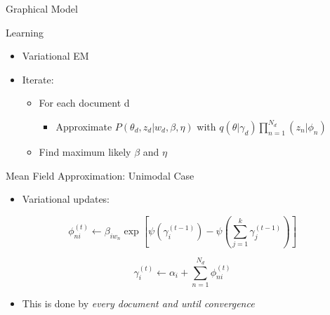 \documentclass[pdf]{beamer}
\begin{document}
\begin{frame}{Graphical Model}
\end{frame}

\begin{frame}{Learning}
	\begin{itemize}
		\item Variational EM
		\item Iterate:
		\begin{itemize}
			\item For each document d
				\begin{itemize}
					\item Approximate $P(\theta_d, z_d|w_d, \beta, \eta)$ with $q(\theta|\gamma_d) \prod_{n=1}^{N_d}(z_n|\phi_n)$
				\end{itemize}
			\item Find maximum likely $\beta$ and $\eta$
		\end{itemize}
	\end{itemize}
\end{frame}

\begin{frame}{Mean Field Approximation: Unimodal Case}
	\begin{itemize}
		\item Variational updates:
	\end{itemize}
	\begin{equation*}
		\phi_{ni}^{(t)} \gets \beta_{i w_n} \exp\left[\psi\left(\gamma_{i}^{(t-1)}\right) - \psi\left({\sum_{j=1}^k \gamma_j^{(t-1)}}\right)\right]
	\end{equation*}
	
	\begin{equation*}
		\gamma_i^{(t)}\gets \alpha_i + \sum_{n=1}^{N_d} \phi_{ni}^{(t)}
	\end{equation*}
	\begin{itemize}
		\item This is done by \textit{every document and until convergence}
	\end{itemize}

\end{frame}
\end{document}
